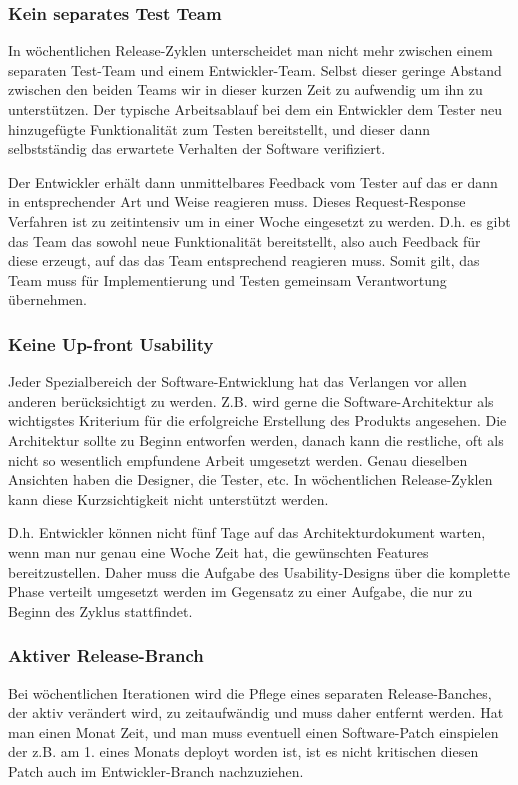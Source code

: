 \subsubsection{Kein separates Test Team}
In wöchentlichen Release-Zyklen unterscheidet man nicht mehr zwischen einem
separaten Test-Team und einem Entwickler-Team. Selbst dieser geringe Abstand
zwischen den beiden Teams wir in dieser kurzen Zeit zu aufwendig um ihn zu
unterstützen. Der typische Arbeitsablauf bei dem ein Entwickler dem Tester neu
hinzugefügte Funktionalität zum Testen bereitstellt, und dieser dann
selbstständig das erwartete Verhalten der Software verifiziert.

Der Entwickler erhält dann unmittelbares Feedback vom Tester auf das er dann
in entsprechender Art und Weise reagieren muss. Dieses Request-Response
Verfahren ist zu zeitintensiv um in einer Woche eingesetzt zu werden. D.h. es
gibt das Team das sowohl neue Funktionalität bereitstellt, also auch Feedback
für diese erzeugt, auf das das Team entsprechend reagieren muss. Somit gilt,
das Team muss für Implementierung und Testen gemeinsam Verantwortung
übernehmen.

\subsubsection{Keine Up-front Usability}
Jeder Spezialbereich der Software-Entwicklung hat das Verlangen vor allen
anderen berücksichtigt zu werden. Z.B. wird gerne die Software-Architektur als
wichtigstes Kriterium für die erfolgreiche Erstellung des Produkts angesehen.
Die Architektur sollte zu Beginn entworfen werden, danach kann die restliche,
oft als nicht so wesentlich empfundene Arbeit umgesetzt werden. Genau
dieselben Ansichten haben die Designer, die Tester, etc. In wöchentlichen
Release-Zyklen kann diese Kurzsichtigkeit nicht unterstützt werden.

D.h. Entwickler können nicht fünf Tage auf das Architekturdokument warten,
wenn man nur genau eine Woche Zeit hat, die gewünschten Features
bereitzustellen. Daher muss die Aufgabe des Usability-Designs über die
komplette Phase verteilt umgesetzt werden im Gegensatz zu einer Aufgabe, die
nur zu Beginn des Zyklus stattfindet.

\subsubsection{Aktiver Release-Branch}
Bei wöchentlichen Iterationen wird die Pflege eines separaten Release-Banches,
der aktiv verändert wird, zu zeitaufwändig und muss daher entfernt werden. Hat
man einen Monat Zeit, und man muss eventuell einen Software-Patch einspielen
der z.B. am 1. eines Monats deployt worden ist, ist es nicht kritischen diesen
Patch auch im Entwickler-Branch nachzuziehen.

